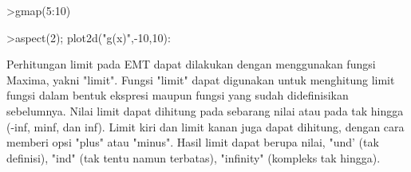 \documentclass{article}
\begin{document}
\begin{eulernotebook}
\begin{eulercomment}
\begin{eulercomment}
\begin{euleroutput}
  [0,  1,  1.41421,  1.73205,  2,  2.23607]
\end{euleroutput}
\begin{eulerprompt}
>gmap(5:10)
\end{eulerprompt}
\begin{euleroutput}
  [0,  1,  1.41421,  1.73205,  2,  2.23607]
\end{euleroutput}
\begin{eulerprompt}
>aspect(2); plot2d("g(x)",-10,10):
\end{eulerprompt}
\begin{eulercomment}
Perhitungan limit pada EMT dapat dilakukan dengan menggunakan fungsi
Maxima, yakni "limit". Fungsi "limit" dapat digunakan untuk menghitung
limit fungsi dalam bentuk ekspresi maupun fungsi yang sudah
didefinisikan sebelumnya. Nilai limit dapat dihitung pada sebarang
nilai atau pada tak hingga (-inf, minf, dan inf). Limit kiri dan limit
kanan juga dapat dihitung, dengan cara memberi opsi "plus" atau
"minus". Hasil limit dapat berupa nilai, "und' (tak definisi), "ind"
(tak tentu namun terbatas), "infinity" (kompleks tak hingga).


\end{eulercomment}
\end{eulercomment}
\end{eulercomment}
\end{eulernotebook}
\end{document}
